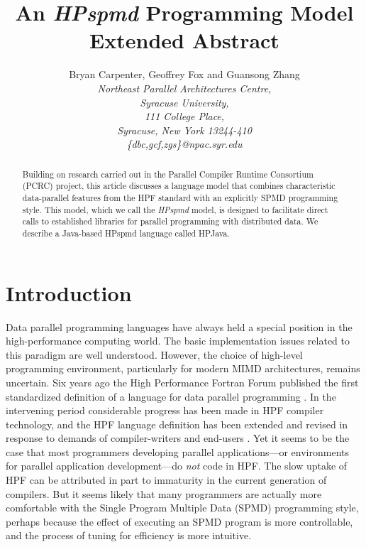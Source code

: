 



\sloppy

\pagestyle{plain}

\title{An {\em HPspmd} Programming Model{\vspace{0.2in}}\\
       Extended Abstract}

\author{Bryan Carpenter, Geoffrey Fox and Guansong Zhang\vspace{0.2in} \\ 
        \em Northeast Parallel Architectures Centre, \\
        \em Syracuse University, \\
        \em 111 College Place, \\
        \em Syracuse, New York 13244-410 \\
        \em \{dbc,gcf,zgs\}@npac.syr.edu}

\maketitle

\begin{abstract}
Building on research carried out in the Parallel Compiler Runtime
Consortium (PCRC) project, this article discusses a language model that
combines characteristic data-parallel features from the HPF standard
with an explicitly SPMD programming style.  This model, which we call
the {\em HPspmd} model, is designed to facilitate direct calls to
established libraries for parallel programming with distributed data.
We describe a Java-based HPspmd language called HPJava.
\end{abstract}

\section{Introduction}

Data parallel programming languages have always held a special position
in the high-performance computing world.  The basic implementation
issues related to this paradigm are well understood.  However, the
choice of high-level programming environment, particularly for modern
MIMD architectures, remains uncertain.  Six years ago the High
Performance Fortran Forum published the first standardized definition
of a language for data parallel programming
\cite{HPFStandard,HPFBook}.  In the intervening period considerable
progress has been made in HPF compiler technology, and the HPF language
definition has been extended and revised in response to demands of
compiler-writers and end-users \cite{HPF2Standard}.  Yet it seems to be
the case that most programmers developing parallel applications---or
environments for parallel application development---do {\em not} code
in HPF.  The slow uptake of HPF can be attributed in part to immaturity
in the current generation of compilers.  But it seems likely that many
programmers are actually more comfortable with the Single Program
Multiple Data (SPMD) programming style, perhaps because the effect of
executing an SPMD program is more controllable, and the process of
tuning for efficiency is more intuitive.


